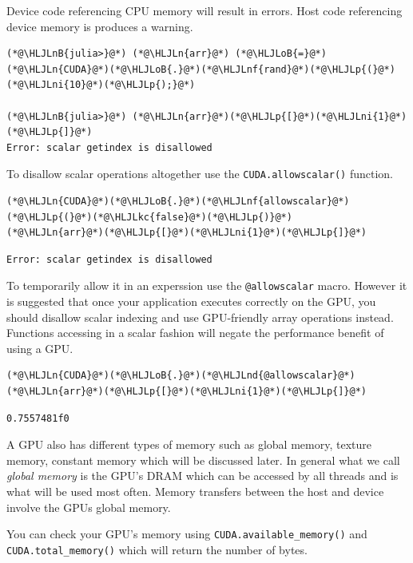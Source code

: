 \documentclass[12pt,a4paper]{article}
\newcommand{\HLJLkc}[1]{\textcolor[RGB]{59,151,46}{\textit{#1}}}
\newcommand{\HLJLn}[1]{#1}
\newcommand{\HLJLnd}[1]{\textcolor[RGB]{214,102,97}{#1}}
\newcommand{\HLJLnf}[1]{\textcolor[RGB]{66,102,213}{#1}}
\newcommand{\HLJLnB}[1]{\textcolor[RGB]{59,151,46}{#1}}
\newcommand{\HLJLni}[1]{\textcolor[RGB]{59,151,46}{#1}}
\newcommand{\HLJLoB}[1]{\textcolor[RGB]{102,102,102}{\textbf{#1}}}
\newcommand{\HLJLp}[1]{#1}
\begin{document}
Device code referencing CPU memory will result in errors. Host code referencing device memory is produces a warning.


\begin{lstlisting}
(*@\HLJLnB{julia>}@*) (*@\HLJLn{arr}@*) (*@\HLJLoB{=}@*) (*@\HLJLn{CUDA}@*)(*@\HLJLoB{.}@*)(*@\HLJLnf{rand}@*)(*@\HLJLp{(}@*)(*@\HLJLni{10}@*)(*@\HLJLp{);}@*)

(*@\HLJLnB{julia>}@*) (*@\HLJLn{arr}@*)(*@\HLJLp{[}@*)(*@\HLJLni{1}@*)(*@\HLJLp{]}@*)
Error: scalar getindex is disallowed
\end{lstlisting}

To disallow scalar operations altogether use the \texttt{CUDA.allowscalar()} function.


\begin{lstlisting}
(*@\HLJLn{CUDA}@*)(*@\HLJLoB{.}@*)(*@\HLJLnf{allowscalar}@*)(*@\HLJLp{(}@*)(*@\HLJLkc{false}@*)(*@\HLJLp{)}@*)
(*@\HLJLn{arr}@*)(*@\HLJLp{[}@*)(*@\HLJLni{1}@*)(*@\HLJLp{]}@*)
\end{lstlisting}

\begin{lstlisting}
Error: scalar getindex is disallowed
\end{lstlisting}


To temporarily allow it in an experssion use the \texttt{@allowscalar} macro. However it is suggested that once your application executes correctly on the GPU, you should disallow scalar indexing and use GPU-friendly array operations instead. Functions accessing in a scalar fashion will negate the performance benefit of using a GPU. 


\begin{lstlisting}
(*@\HLJLn{CUDA}@*)(*@\HLJLoB{.}@*)(*@\HLJLnd{@allowscalar}@*) (*@\HLJLn{arr}@*)(*@\HLJLp{[}@*)(*@\HLJLni{1}@*)(*@\HLJLp{]}@*)
\end{lstlisting}

\begin{lstlisting}
0.7557481f0
\end{lstlisting}


A GPU also has different types of memory such as global memory, texture memory, constant memory which will be discussed later. In general what we call \emph{global memory} is the GPU's DRAM which can be accessed by all threads and is what will be used most often. Memory transfers between the host and device involve the GPUs global memory.

You can check your GPU's memory using \texttt{CUDA.available\_memory()} and \texttt{CUDA.total\_memory()} which will return the number of bytes.
\end{document}
